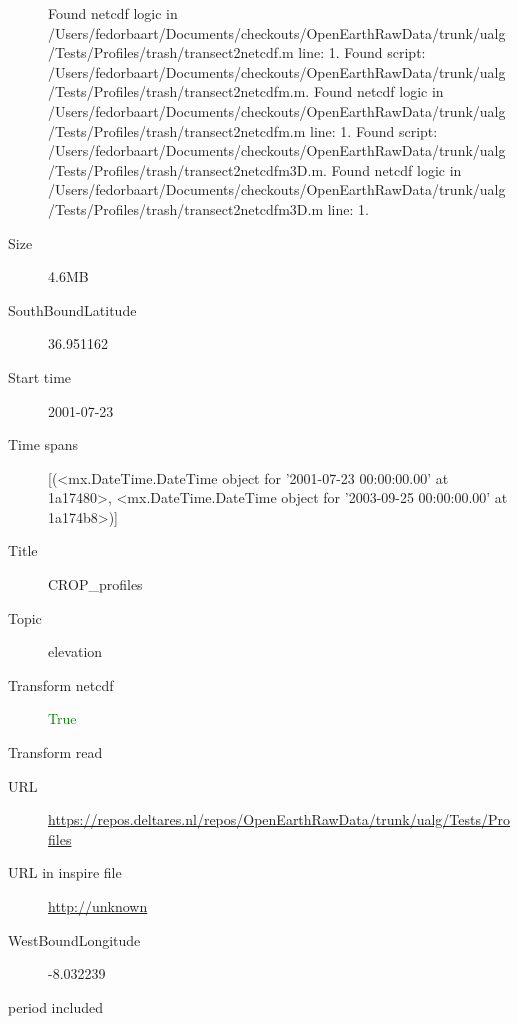 \documentclass[9]{report}
\begin{document}
\begin{description}
Found netcdf logic in /Users/fedorbaart/Documents/checkouts/OpenEarthRawData/trunk/ualg/Tests/Profiles/trash/transect2netcdf.m line: 1.
Found script: /Users/fedorbaart/Documents/checkouts/OpenEarthRawData/trunk/ualg/Tests/Profiles/trash/transect2netcdfm.m.
Found netcdf logic in /Users/fedorbaart/Documents/checkouts/OpenEarthRawData/trunk/ualg/Tests/Profiles/trash/transect2netcdfm.m line: 1.
Found script: /Users/fedorbaart/Documents/checkouts/OpenEarthRawData/trunk/ualg/Tests/Profiles/trash/transect2netcdfm3D.m.
Found netcdf logic in /Users/fedorbaart/Documents/checkouts/OpenEarthRawData/trunk/ualg/Tests/Profiles/trash/transect2netcdfm3D.m line: 1.
  \item[Size] 4.6MB
  \item[SouthBoundLatitude] 36.951162
  \item[Start time] 2001-07-23
  \item[Time spans] [(<mx.DateTime.DateTime object for '2001-07-23 00:00:00.00' at 1a17480>, <mx.DateTime.DateTime object for '2003-09-25 00:00:00.00' at 1a174b8>)]
  \item[Title]  CROP\_profiles 
  \item[Topic] elevation
  \item[Transform netcdf] \textcolor{green}{True}
  \item[Transform read] \textcolor{blue}{}
  \item[URL] \href{https://repos.deltares.nl/repos/OpenEarthRawData/trunk/ualg/Tests/Profiles}{https://repos.deltares.nl/repos/OpenEarthRawData/trunk/ualg/Tests/Profiles}
  \item[URL in inspire file] \href{http://unknown}{http://unknown}
  \item[WestBoundLongitude] -8.032239
  \item[period included] 
\end{description}
\end{document}
